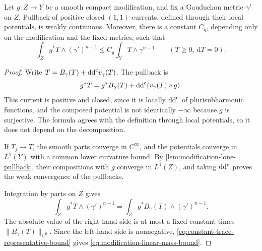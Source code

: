 \begin{proposition}\label{prop:closed-current-modification-continuity}
Let $g\colon Z\to Y$ be a smooth compact modification, and fix a Gauduchon metric $\gamma'$ on $Z$. Pullback of positive closed $(1,1)$-currents, defined through their local potentials, is weakly continuous. Moreover, there is a constant $C_g$, depending only on the modification and the fixed metrics, such that
\begin{equation}\label{eq:modification-linear-mass-bound}
 \int_Zg^*T\wedge(\gamma')^{n-1}
       \leq C_g\int_YT\wedge\gamma^{n-1}
       \qquad(T\geq0,\ \mathrm{d}T=0).
\end{equation}
\end{proposition}
\begin{proof}
Write $T=B_\gamma(T)+\mathrm{dd}^{\mathrm{c}} v_\gamma(T)$. The pullback is
\[
 g^*T=g^*B_\gamma(T)+\mathrm{dd}^{\mathrm{c}}(v_\gamma(T)\circ g).
\]
This current is positive and closed, since it is locally $\mathrm{dd}^{\mathrm{c}}$ of plurisubharmonic functions, and the composed potential is not identically $-\infty$ because $g$ is surjective. The formula agrees with the definition through local potentials, so it does not depend on the decomposition.

If $T_j\to T$, the smooth parts converge in $C^\infty$, and the potentials converge in $L^1(Y)$ with a common lower curvature bound. By \cref{lem:modification-lone-pullback}, their compositions with $g$ converge in $L^1(Z)$, and taking $\mathrm{dd}^{\mathrm{c}}$ proves the weak convergence of the pullbacks.

Integration by parts on $Z$ gives
\[
 \int_Zg^*T\wedge(\gamma')^{n-1}
   =\int_Zg^*B_\gamma(T)\wedge(\gamma')^{n-1}.
\]
The absolute value of the right-hand side is at most a fixed constant times $\|B_\gamma(T)\|_{C^0}$. Since the left-hand side is nonnegative, \eqref{eq:constant-trace-representative-bound} gives \eqref{eq:modification-linear-mass-bound}.
\end{proof}

